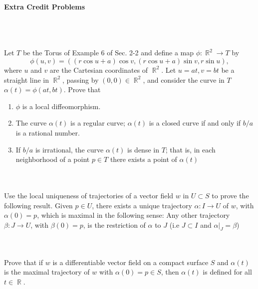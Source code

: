 \documentclass[12pt,letterpaper]{hmcpset}
\DeclareMathOperator{\R}{\mathbb{R}}
\begin{document}
\newpage 
\textbf{Extra Credit Problems} \\
\\
\begin{problem}
\\ \\
Let $T$ be the Torus of Example 6 of Sec. 2-2 and define a map $\phi:\R^2\to T$ by 
$$\phi(u,v) = ((r\cos u+a)\cos v, (r\cos u + a)\sin v, r\sin u),$$
where $u$ and $v$ are the Cartesian coordinates of $\R^2$. Let $u=at, v=bt$ be a straight line in $\R^2$, passing by $(0,0) \in \R^2$, and consider the curve in $T$ $\alpha(t) = \phi(at,bt)$. Prove that 
\begin{enumerate}
    \item $\phi$ is a local diffeomorphism. 
    \item The curve $\alpha(t)$ is a regular curve; $\alpha(t)$ is a closed curve if and only if $b/a$ is a rational number.
    \item If $b/a$ is irrational, the curve $\alpha(t)$ is dense in $T$; that is, in each neighborhood of a point $p\in T$ there exists a point of $\alpha(t)$\\
\end{enumerate}
\end{problem}
\begin{solution}
\end{solution}

\begin{problem}
\\ \\
Use the local uniqueness of trajectories of a vector field $w$ in $U\subset S$ to prove the following result. Given $p\in U$, there exists a unique trajectory $\alpha:I\to U$ of $w$, with $\alpha(0) = p$, which is maximal in the following sense: Any other trajectory $\beta:J\to U$, with $\beta(0) = p$, is the restriction of $\alpha$ to $J$ (i.e $J\subset I$ and $\alpha|_J = \beta$)\\
\end{problem}
\begin{solution}
\end{solution}

\begin{problem}
\\ \\
Prove that if $w$ is a differentiable vector field on a compact surface $S$ and $\alpha(t)$ is the maximal trajectory of $w$ with $\alpha(0) = p \in S$, then $\alpha(t)$ is defined for all $t\in \R$. 
\end{problem}
\begin{solution}
\end{solution}
\end{document}

